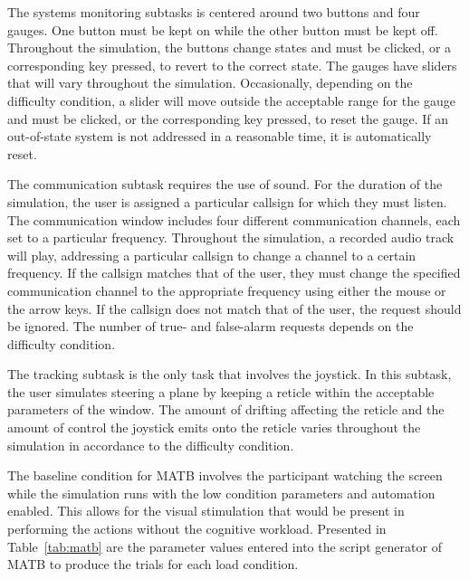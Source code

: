 \documentclass[11pt]{article}
\begin{document}
The systems monitoring subtasks is centered around two buttons and four gauges. One button must be kept on while the other button must be kept off. Throughout the simulation, the buttons change states and must be clicked, or a corresponding key pressed, to revert to the correct state. The gauges have sliders that will vary throughout the simulation. Occasionally, depending on the difficulty condition, a slider will move outside the acceptable range for the gauge and must be clicked, or the corresponding key pressed, to reset the gauge. If an out-of-state system is not addressed in a reasonable time, it is automatically reset.

The communication subtask requires the use of sound. For the duration of the simulation, the user is assigned a particular callsign for which they must listen. The communication window includes four different communication channels, each set to a particular frequency. Throughout the simulation, a recorded audio track will play, addressing a particular callsign to change a channel to a certain frequency. If the callsign matches that of the user, they must change the specified communication channel to the appropriate frequency using either the mouse or the arrow keys. If the callsign does not match that of the user, the request should be ignored. The number of true- and false-alarm requests depends on the difficulty condition. 

The tracking subtask is the only task that involves the joystick. In this subtask, the user simulates steering a plane by keeping a reticle within the acceptable parameters of the window. The amount of drifting affecting the reticle and the amount of control the joystick emits onto the reticle varies throughout the simulation in accordance to the difficulty condition.

The baseline condition for MATB involves the participant watching the screen while the simulation runs with the low condition parameters and automation enabled. This allows for the visual stimulation that would be present in performing the actions without the cognitive workload. Presented in Table~\ref{tab:matb} are the parameter values entered into the script generator of MATB to produce the trials for each load condition.
\end{document}

